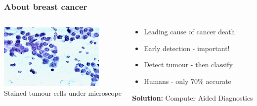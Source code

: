 \documentclass[aspectratio=1610]{beamer}
\begin{document}
\begin{frame}
  \frametitle{\hfill About breast cancer}
  \begin{columns}[T]
    \begin{column}{.5\textwidth}
      \begin{block}{}
        \includegraphics[width=\textwidth]{images/fna_nuclei.png}\\
        Stained tumour cells under microscope
      \end{block}
    \end{column}
    \begin{column}{.5\textwidth}
      \begin{block}{}
        \begin{itemize}
          \item Leading cause of cancer death\pause
          \item Early detection - important!
          \item Detect tumour - then classify\pause
          \item Humans - only 70\% accurate\pause
        \end{itemize}
        \vspace{0.02\textheight}
        \textbf{Solution:} Computer Aided Diagnostics
      \end{block}
    \end{column}
  \end{columns}
\end{frame}
\end{document}
